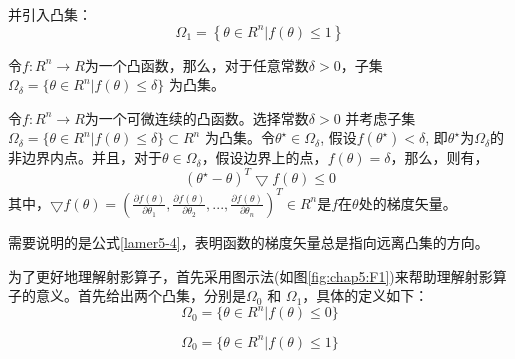 并引入凸集：
\begin{equation}
\Omega _1= \left \{    \theta \in R^n | f(\theta) \leqslant  1  \right \}
\end{equation}




\begin{lem}
令$f: R^n \rightarrow R$为一个凸函数，那么，对于任意常数$\delta>0$，子集$\Omega_\delta = \{ \theta \in R^n |  f(\theta)\leq \delta  \}$ 为凸集。
\end{lem}


\begin{lem}
令$f: R^n \rightarrow R$为一个可微连续的凸函数。选择常数$\delta>0$ 并考虑子集$\Omega_\delta = \{ \theta \in R^n |  f(\theta)\leq \delta  \} \subset R^{n}$ 为凸集。令$\theta^\star \in \Omega_{\delta}$, 假设$f(\theta ^ \star) < \delta$, 即$ \theta ^ \star $为$\Omega_\delta$的非边界内点。并且，对于$\theta \in \Omega_{\delta}$，假设边界上的点，$f(\theta) = \delta$，那么，则有，
\begin{equation}
\label{lamer5-4}
(\theta^\star  -\theta)^T \bigtriangledown f(\theta) \leq 0
\end{equation}
其中，$\bigtriangledown f(\theta) = (\frac{\partial f(\theta)}{\partial \theta_1}, \frac{\partial f(\theta)}{\partial \theta_2},...,\frac{\partial f(\theta)}{\partial \theta_n})^T \in  R^{n}$是$f$在$\theta$处的梯度矢量。
\end{lem}

需要说明的是公式\ref{lamer5-4}，表明函数的梯度矢量总是指向远离凸集的方向。


为了更好地理解射影算子，首先采用图示法(如图\ref{fig:chap5:F1})来帮助理解射影算子的意义。首先给出两个凸集，分别是$\Omega_{0}$ 和 $\Omega_{1}$，具体的定义如下：
\begin{equation}
\Omega_{0} = \{ \theta \in R^n| f(\theta) \leq  0   \}
\end{equation}

\begin{equation}
\Omega_{0} = \{ \theta \in R^n| f(\theta) \leq  1 \}
\end{equation}

